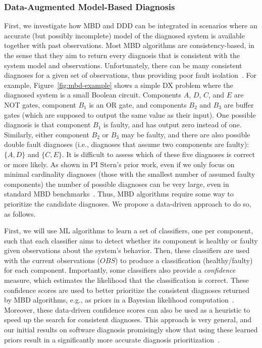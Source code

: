 \documentclass[12pt]{article}
\begin{document}
\subsubsection{Data-Augmented Model-Based Diagnosis} 
First, we investigate how MBD and DDD can be integrated in scenarios where an accurate (but possibly incomplete) model of the diagnosed system is available together with past observations. 
Most MBD algorithms are consistency-based, in the sense that they aim to return every diagnosis  that is consistent with the system model and observations. 
Unfortunately, there can be many consistent diagnoses for a given set of observations, thus providing poor fault isolation~\cite{stern2015many}. 
For example, Figure~\ref{fig:mbd-example} shows a simple DX problem where the diagnosed system is a small Boolean circuit. Components $A$, $D$, $C$, and $E$ are NOT gates, component $B_1$ is an OR gate, and components $B_2$ and $B_3$ are buffer gates (which are supposed to output the same value as their input). One possible diagnosis is that component $B_1$ is faulty, and has output zero instead of one. Similarly, either component $B_2$ or $B_3$ may be faulty, 
and there are also possible double fault diagnoses (i.e., diagnoses that assume two components are faulty): $\{ A,D \}$ and $\{C,E\}$. It is difficult to assess which of these five diagnoses is correct or more likely. 
As shown in PI Stern's prior work, even if we only focus on minimal cardinality diagnoses (those with the smallest number of assumed faulty components) the number of possible diagnoses can be very large, even in standard MBD benchmarks~\cite{stern2015many}. Thus, MBD algorithms require some way to prioritize the candidate diagnoses. We propose a data-driven approach to do so, as follows. 


First, we will use ML algorithms to learn a set of classifiers, one per component, such that each classifier aims to detect whether its component is healthy or faulty given observations about the system's behavior. 
Then, these classifiers are used with the current observations ($OBS$) to produce a classification (healthy/faulty) for each component. Importantly, some classifiers also provide a {\em confidence} measure, which estimates the likelihood that the classification is correct. These confidence scores are used 
to better prioritize the consistent diagnoses returned by MBD algorithms, e.g., as priors in a Bayesian likelihood computation~\cite{abreu2009new}. Moreover, these data-driven confidence scores can also be used as a heuristic to speed up the search for consistent diagnoses. This approach is very general, and our initial results on software  diagnosis promisingly show that using these learned priors result in a significantly more accurate diagnosis prioritization~\cite{elmishali2016dataAugmented}. 
\end{document}
